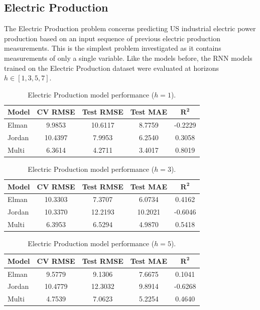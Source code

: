 \documentclass[conference]{IEEEtran}
\begin{document}
\subsection{\textbf{Electric Production}}

The Electric Production problem concerns predicting US industrial electric power production based on an input sequence of previous electric production measurements. This is the simplest problem investigated as it contains measurements of only a single variable. Like the models before, the RNN models trained on the Electric Production dataset were evaluated at horizons $h \in [1,3,5,7]$.

\begin{table}[H]
\centering
\caption{Electric Production model performance ($h=1$).}
\label{tab:ep_h1}
\begin{tabular}{lcccc}
\toprule
\textbf{Model} & \textbf{CV RMSE} & \textbf{Test RMSE} & \textbf{Test MAE} & $\mathbf{R^2}$ \\
\midrule
Elman  & 9.9853  & 10.6117 & 8.7759 & -0.2229 \\
Jordan & 10.4397 & 7.9953  & 6.2540 & 0.3058 \\
Multi  & 6.3614  & 4.2711  & 3.4017 & 0.8019 \\
\bottomrule
\end{tabular}
\end{table}

\begin{table}[H]
\centering
\caption{Electric Production model performance ($h=3$).}
\label{tab:ep_h3}
\begin{tabular}{lcccc}
\toprule
\textbf{Model} & \textbf{CV RMSE} & \textbf{Test RMSE} & \textbf{Test MAE} & $\mathbf{R^2}$ \\
\midrule
Elman  & 10.3303 & 7.3707  & 6.0734 & 0.4162 \\
Jordan & 10.3370 & 12.2193 & 10.2021 & -0.6046 \\
Multi  & 6.3953  & 6.5294  & 4.9870 & 0.5418 \\
\bottomrule
\end{tabular}
\end{table}

\begin{table}[H]
\centering
\caption{Electric Production model performance ($h=5$).}
\label{tab:ep_h5}
\begin{tabular}{lcccc}
\toprule
\textbf{Model} & \textbf{CV RMSE} & \textbf{Test RMSE} & \textbf{Test MAE} & $\mathbf{R^2}$ \\
\midrule
Elman  & 9.5779  & 9.1306  & 7.6675 & 0.1041 \\
Jordan & 10.4779 & 12.3032 & 9.8914 & -0.6268 \\
Multi  & 4.7539  & 7.0623  & 5.2254 & 0.4640 \\
\bottomrule
\end{tabular}
\end{table}
\end{document}
